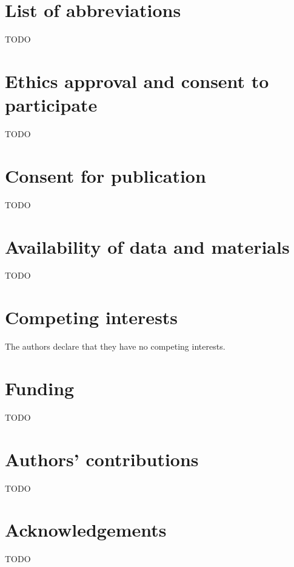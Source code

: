\section{List of abbreviations}
TODO

\section{Ethics approval and consent to participate}
TODO

\section{Consent for publication}
TODO

\section{Availability of data and materials}
TODO

\section{Competing interests}
The authors declare that they have no competing interests.

\section{Funding}
TODO

\section{Authors' contributions}
TODO

\section{Acknowledgements}
TODO

